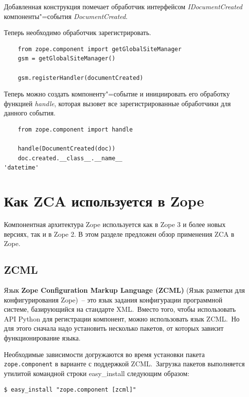 \documentclass[a4paper,openany,twoside,final]{book}
\providecommand*{\DUroletitlereference}[1]{\textsl{#1}}
\begin{document}
Добавленная конструкция помечает обработчик интерфейсом \DUroletitlereference{IDocumentCreated} компоненты"=события \DUroletitlereference{DocumentCreated}.

Теперь необходимо обработчик зарегистрировать.

\begin{verbatim}
    from zope.component import getGlobalSiteManager
    gsm = getGlobalSiteManager()

    gsm.registerHandler(documentCreated)
\end{verbatim}

Теперь можно создать компоненту"=событие и инициировать его обработку функцией \DUroletitlereference{handle}, которая вызовет все зарегистрированные обработчики для данного события.

\begin{verbatim}
    from zope.component import handle

    handle(DocumentCreated(doc))
    doc.created.__class__.__name__
'datetime'
\end{verbatim}


\chapter{Как ZCA используется в Zope%
  \label{zca-zope}%
}

Компонентная архитектура Zope используется как в Zope 3 и более новых версиях, так и в Zope 2.  В этом разделе предложен обзор применения ZCA в Zope.


\section{ZCML%
  \label{zcml}%
}

Язык \textbf{Zope Configuration Markup Language (ZCML)} (Язык разметки для конфигурирования Zope)~-- это язык задания конфигурации программной системе, базирующийся на стандарте XML.~Вместо того, чтобы использовать API Python для регистрации компонент, можно использовать язык ZCML.~Но для этого сначала надо установить несколько пакетов, от которых зависит функционирование языка.

Необходимые зависимости догружаются во время установки пакета \texttt{zope.component} в варианте с поддержкой ZCML.~Загрузка пакетов выполняется утилитой командной строки easy\_install следующим образом:

\begin{verbatim}
$ easy_install "zope.component [zcml]"
\end{verbatim}
\end{document}
